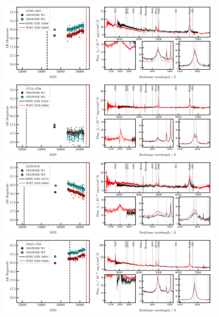 \documentclass[a4paper,fleqn,usenatbib]{mnras}
\begin{document}
\begin{figure}
  \centering
  \includegraphics[width=16.7cm, trim=0.0cm 0.05cm 0.2cm 0.1cm, clip]
   {../plots/LCs_and_spectra/J1709+3421_landscape_temp.png}
  \includegraphics[width=16.7cm, trim=0.0cm 0.05cm 0.2cm 0.1cm, clip]
  {../plots/LCs_and_spectra/J1713+2736_landscape_temp.png}
  \includegraphics[width=16.7cm, trim=0.0cm 0.05cm 0.2cm 0.1cm, clip]
  {../plots/LCs_and_spectra/J2102-0645_landscape_temp.png}
  \includegraphics[width=16.7cm, trim=0.0cm 0.05cm 0.2cm 0.1cm, clip]
  {../plots/LCs_and_spectra/J2222+1733_landscape_temp.png}
    \vspace{-12pt}
  \caption[]{}
  \label{fig:all_spectra_d}
\end{figure}
\end{document}
